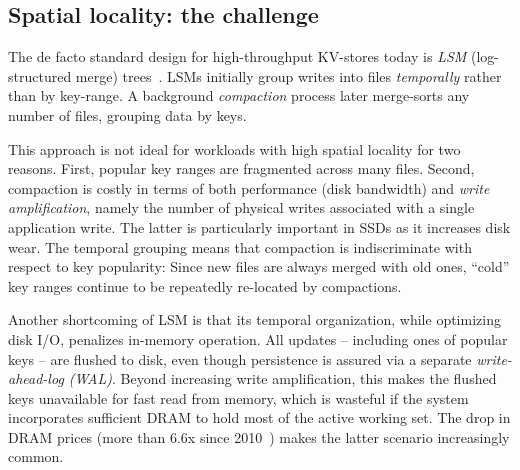 \subsection{Spatial locality: the challenge}  
\label{ssec:B-tree-compare}



The de facto standard design for high-throughput KV-stores today is \emph{LSM} (log-structured merge) trees~\cite{DBLP:journals/acta/ONeilCGO96}. 
LSMs initially group writes  into files \emph{temporally} rather than by key-range. 
A background \emph{compaction} process later merge-sorts any number of files, grouping data by keys. 

This approach is not ideal for workloads with high spatial locality for two reasons. 
First,  popular key ranges are fragmented across many files. 
Second,  compaction  is costly in terms of  both performance 
(disk bandwidth) and \emph{write amplification}, namely the number of physical writes 
associated with a single application write. The latter is  particularly important in SSDs as it increases disk wear. 
The temporal grouping means that compaction is indiscriminate with respect to key popularity:  
Since new  files are always merged with old ones, 
 ``cold'' key ranges  continue to be repeatedly re-located by  compactions.  

Another shortcoming of LSM is that its temporal organization, while optimizing disk I/O,  penalizes in-memory operation. 
All updates -- including ones of popular keys -- are flushed to disk, even though persistence is assured via a separate \emph{write-ahead-log (WAL)}.
Beyond increasing write amplification, this makes the flushed keys unavailable for fast read from memory,
which is  wasteful if the system incorporates sufficient DRAM to hold most of the active working set. 
The drop in DRAM prices (more than $6.6$x since 2010~\cite{dram-prices}) makes the latter scenario increasingly common.  

